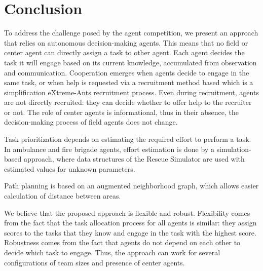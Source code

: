 \section{Conclusion}

To address the challenge posed by the agent competition, we present an approach that relies on autonomous decision-making agents. This means that no field or center agent can directly assign a task to other agent. Each agent decides the task it will engage based on its current knowledge, accumulated from observation and communication. Cooperation emerges when agents decide to engage in the same task, or when help is requested via a recruitment method based which is a simplification eXtreme-Ants recruitment process. Even during recruitment, agents are not directly recruited: they can decide whether to offer help to the recruiter or not. The role of center agents is informational, thus in their absence, the decision-making process of field agents does not change.


Task prioritization depends on estimating the required effort to perform a task. In ambulance and fire brigade agents, effort estimation is done by a simulation-based approach, where data structures of the Rescue Simulator are used with estimated values for unknown parameters. 

Path planning is based on an augmented neighborhood graph, which allows easier calculation of distance between areas.

We believe that the proposed approach is flexible and robust. Flexibility comes from the fact that the task allocation process for all agents is similar: they assign scores to the tasks that they know and engage in the task with the highest score. Robustness comes from the fact that agents do not depend on each other to decide which task to engage. Thus, the approach can work for several configurations of team sizes and presence of center agents.


